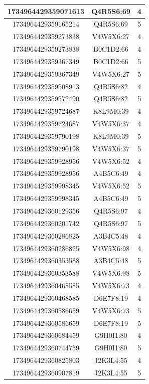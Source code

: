 \begin{table}[h]
\begin{tabular}{| c | c | c |}
		1734964429359071613 & Q4R5S6:69 & 4 \\\hline
		1734964429359165214 & Q4R5S6:69 & 5 \\\hline
		1734964429359273838 & V4W5X6:27 & 4 \\\hline
		1734964429359273838 & B0C1D2:66 & 4 \\\hline
		1734964429359367349 & B0C1D2:66 & 5 \\\hline
		1734964429359367349 & V4W5X6:27 & 5 \\\hline
		1734964429359508913 & Q4R5S6:82 & 4 \\\hline
		1734964429359572490 & Q4R5S6:82 & 5 \\\hline	
		1734964429359724687 & K8L9M0:39 & 4 \\\hline
		1734964429359724687 & V4W5X6:37 & 4 \\\hline
		1734964429359790198 & K8L9M0:39 & 5 \\\hline
		1734964429359790198 & V4W5X6:37 & 5 \\\hline
		1734964429359928956 & V4W5X6:52 & 4 \\\hline
		1734964429359928956 & A4B5C6:49 & 4 \\\hline
		1734964429359998345 & V4W5X6:52 & 5 \\\hline
		1734964429359998345 & A4B5C6:49 & 5 \\\hline
		1734964429360129356 & Q4R5S6:97 & 4 \\\hline
		1734964429360201742 & Q4R5S6:97 & 5 \\\hline
		1734964429360286825 & A3B4C5:48 & 4 \\\hline
		1734964429360286825 & V4W5X6:98 & 4 \\\hline
		1734964429360353588 & A3B4C5:48 & 5 \\\hline
		1734964429360353588 & V4W5X6:98 & 5 \\\hline
		1734964429360468585 & V4W5X6:73 & 4 \\\hline
		1734964429360468585 & D6E7F8:19 & 4 \\\hline
		1734964429360586659 & V4W5X6:73 & 5 \\\hline
		1734964429360586659 & D6E7F8:19 & 5 \\\hline
		1734964429360684459 & G9H0I1:80 & 4 \\\hline
		1734964429360744759 & G9H0I1:80 & 5 \\\hline
		1734964429360825803 & J2K3L4:55 & 4 \\\hline
		1734964429360907819 & J2K3L4:55 & 5 \\\hline

\end{tabular}
\end{table}
